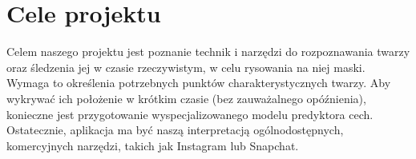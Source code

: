 \section{Cele projektu}
Celem naszego projektu jest poznanie technik i narzędzi do rozpoznawania twarzy
oraz śledzenia jej w czasie rzeczywistym, w celu rysowania na niej maski. Wymaga to określenia potrzebnych punktów charakterystycznych twarzy. Aby wykrywać ich położenie w krótkim czasie (bez zauważalnego opóźnienia), konieczne jest przygotowanie wyspecjalizowanego modelu predyktora cech. 
Ostatecznie, aplikacja ma być naszą interpretacją ogólnodostępnych, komercyjnych narzędzi, takich jak Instagram lub Snapchat.

